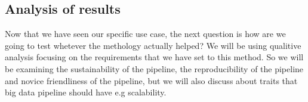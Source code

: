 

\subsection{Analysis of results}

Now that we have seen our specific use case, the next question is how are we going to test whetever the methology actually helped?
We will be using qualitive analysis focusing on the requirements that we have set to this method. %
So we will be examining the sustainability of the pipeline, the reproducibility of the pipeline and novice friendliness of the pipeline, but we will also discuss about traits that big data pipeline should have e.g scalability.



